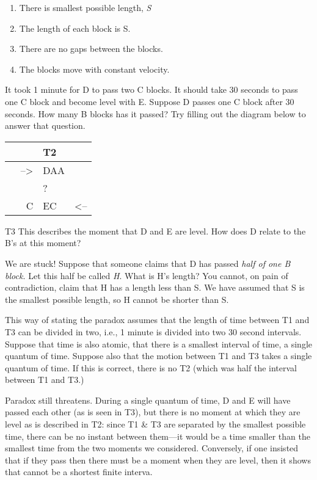 \documentclass[]{article}
\begin{document}
\begin{enumerate}
\def\labelenumi{\arabic{enumi}.}
\itemsep1pt\parskip0pt
\item
  There is smallest possible length, \emph{S}
\item
  The length of each block is S.
\item
  There are no gaps between the blocks.
\item
  The blocks move with constant velocity.
\end{enumerate}

It took 1 minute for D to pass two C blocks. It should take 30 seconds to
pass one C block and become level with E. Suppose D passes one C block after 30 seconds. How
many B blocks has it passed? Try filling out the diagram below to answer
that question.

\begin{longtable}[c]{@{}rll@{}}
\toprule
& T2 &\tabularnewline
\midrule
\endhead
--\textgreater{} & DAA &\tabularnewline
& ? &\tabularnewline
~ ~ C & EC~ & \textless{}--\tabularnewline
\bottomrule
\end{longtable}

T3 This describes the moment that D and E are level. How does D relate to the B's at this moment?

We are stuck! Suppose that someone claims that D has passed \emph{half
of one B block.} Let this half be called \emph{H}. What is H's length?
You cannot, on pain of contradiction, claim that H has a length less
than S. We have assumed that S is the smallest possible length, so H
cannot be shorter than S.

This way of stating the paradox assumes that the length of time between
T1 and T3 can be divided in two, i.e., 1 minute is divided into two 30
second intervals. Suppose that time is also atomic, that there is a
smallest interval of time, a single quantum of time. Suppose also that
the motion between T1 and T3 takes a single quantum of time. If this is
correct, there is no T2 (which was half the interval between T1 and T3.)

Paradox still threatens. During a single quantum of time, D and E will
have passed each other (as is seen in T3), but there is no moment at
which they are level as is described in T2: since T1 \& T3 are
separated by the smallest possible time, there can be no instant between
them---it would be a time smaller than the smallest time from the two
moments we considered. Conversely, if one insisted that if they pass
then there must be a moment when they are level, then it shows that
cannot be a shortest finite interva.
\end{document}
